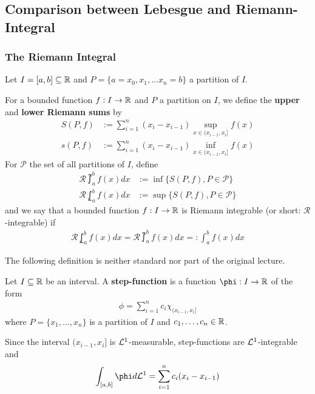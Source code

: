 \subsection{Comparison between Lebesgue and Riemann-Integral}

\subsubsection{The Riemann Integral}

\begin{dfn} \label{dfn:riemann-integral}


Let $I = [a,b] \subseteq \mathbb{R}$ and $P = \{a=x_0,x_1, \ldots x_n = b\}$ a partition of $I$.

For a bounded function $f: I \to \mathbb{R}$ and $P$ a partition on $I$, we define the \textbf{upper} and \textbf{lower Riemann sums} by
\begin{align*}
  S(P,f) &:= \sum_{i=1}^{n}(x_i - x_{i-1}) \sup_{x \in (x_{i-1},x_i]} f(x)
  \\
  s(P,f) &:= \sum_{i=1}^{n}(x_i - x_{i-1}) \inf_{x \in (x_{i-1},x_i]} f(x)
\end{align*}
For $\mathcal{P}$ the set of all partitions of $I$, define
\begin{align*}
  \mathcal{R} \upint_{a}^{b} f(x) d x &:= \inf \{S(P,f), P \in \mathcal{P}\}\\
  \mathcal{R} \lowint_{a}^{b} f(x) d x &:= \sup \{S(P,f), P \in \mathcal{P}\}
\end{align*}
and we say that a bounded function $f: I \to \mathbb{R}$ is Riemann integrable (or short: $\mathcal{R}$-integrable) if
\begin{align*}
  \mathcal{R} \lowint_{a}^{b}f(x) dx = \mathcal{R} \upint_a^{b} f(x) dx =: \int_a^{b} f(x) dx
\end{align*}

\end{dfn}

The following definition is neither standard nor part of the original lecture.
\begin{dfn}[]
  Let $I \subseteq \mathbb{R}$ be an interval.
  A \textbf{step-function} is a function $\phi: I \to \R$ of the form
  \begin{align*}
    \phi = \sum_{i=1}^{n} c_i \chi_{(x_{i-1},x_i]}
  \end{align*}
  where $P = \{x_1,\ldots,x_n\}$ is a partition of $I$ and $c_{1},\ldots,c_n \in \mathbb{R}$.
\end{dfn}

Since the interval $(x_{i-1},x_i]$ is $\mathcal{L}^{1}$-measurable, step-functions are $\mathcal{L}^{1}$-integrable and 
\begin{align*}
  \int_{[a,b]} \phi d \Leb^{1} = \sum_{i=1}^{n}c_i (x_i - x_{i-1})
\end{align*}

